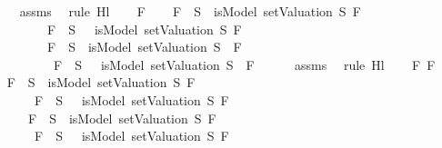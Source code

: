 \begin{isabellebody}
\ \ \ \ \isamarkupfalse%
\ assms\ \isamarkupfalse%
\ {\isacharparenleft}rule\ Hl{}{\isacharunderscore}{}{\isacharparenright}\isanewline
{}\isamarkupfalse%
\isanewline
\ \ \isamarkupfalse%
\ F\isanewline
\ \ \isamarkupfalse%
\ {\isachardoublequoteopen}{\isacharparenleft}F\ {\isasymin}\ S\ {\isasymlongrightarrow}\ isModel\ {\isacharparenleft}setValuation\ S{\isacharparenright}\ F{\isacharparenright}\ {\isasymand}\isanewline
\ \ \ \ \ \ \ \ \ {\isacharparenleft}\isactrlbold {\isasymnot}\ F\ {\isasymin}\ S\ {\isasymlongrightarrow}\ {\isasymnot}\ isModel\ {\isacharparenleft}setValuation\ S{\isacharparenright}\ F{\isacharparenright}\ {\isasymLongrightarrow}\isanewline
\ \ \ \ \ \ \ \ \ {\isacharparenleft}\isactrlbold {\isasymnot}\ F\ {\isasymin}\ S\ {\isasymlongrightarrow}\ isModel\ {\isacharparenleft}setValuation\ S{\isacharparenright}\ {\isacharparenleft}\isactrlbold {\isasymnot}\ F{\isacharparenright}{\isacharparenright}\ {\isasymand}\isanewline
\ \ \ \ \ \ \ \ \ {\isacharparenleft}\isactrlbold {\isasymnot}\ {\isacharparenleft}\isactrlbold {\isasymnot}\ F{\isacharparenright}\ {\isasymin}\ S\ {\isasymlongrightarrow}\ {\isasymnot}\ isModel\ {\isacharparenleft}setValuation\ S{\isacharparenright}\ {\isacharparenleft}\isactrlbold {\isasymnot}\ F{\isacharparenright}{\isacharparenright}{\isachardoublequoteclose}\isanewline
\ \ \ \ \isamarkupfalse%
\ assms\ \isamarkupfalse%
\ {\isacharparenleft}rule\ Hl{}{\isacharunderscore}{}{\isacharparenright}\isanewline
{}\isamarkupfalse%
\isanewline
\ \ \isamarkupfalse%
\ F{}\ F{}\isanewline
\ \ \isamarkupfalse%
\ {\isachardoublequoteopen}{\isacharparenleft}F{}\ {\isasymin}\ S\ {\isasymlongrightarrow}\ isModel\ {\isacharparenleft}setValuation\ S{\isacharparenright}\ F{}{\isacharparenright}\ {\isasymand}\isanewline
\ \ \ \ \ \ \ {\isacharparenleft}\isactrlbold {\isasymnot}\ F{}\ {\isasymin}\ S\ {\isasymlongrightarrow}\ {\isasymnot}\ isModel\ {\isacharparenleft}setValuation\ S{\isacharparenright}\ F{}{\isacharparenright}\ {\isasymLongrightarrow}\isanewline
\ \ \ \ \ \ \ {\isacharparenleft}F{}\ {\isasymin}\ S\ {\isasymlongrightarrow}\ isModel\ {\isacharparenleft}setValuation\ S{\isacharparenright}\ F{}{\isacharparenright}\ {\isasymand}\isanewline
\ \ \ \ \ \ \ {\isacharparenleft}\isactrlbold {\isasymnot}\ F{}\ {\isasymin}\ S\ {\isasymlongrightarrow}\ {\isasymnot}\ isModel\ {\isacharparenleft}setValuation\ S{\isacharparenright}\ F{}{\isacharparenright}\ {\isasymLongrightarrow}\isanewline

\end{isabellebody}
